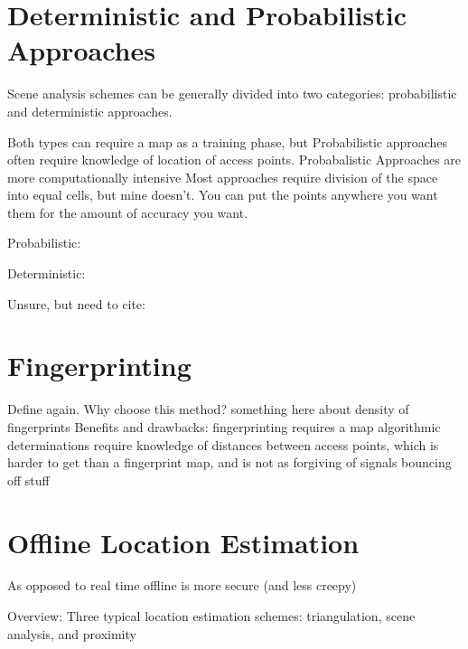 \section{Deterministic and Probabilistic Approaches}
%

Scene analysis schemes can be generally divided into two categories: probabilistic and deterministic approaches. 




Both types can require a map as a training phase, but Probabilistic approaches often require knowledge of location of access points. 
Probabalistic Approaches are more computationally intensive
Most approaches require division of the space into equal cells, but mine doesn't. You can put the points anywhere you want them for the amount of accuracy you want. 

Probabilistic:
\cite{ito2005bayesian}
\cite{seshadri2005bayesian}
\cite{hotta2012robust}

Deterministic:
\cite{arias2004malguki}
\cite{quan2010wi}
\cite{nagaosa2012dept}

Unsure, but need to cite:
\cite{priyantha2005cricket}
\cite{xiong2012towards}
\cite{xiong2013arraytrack}
\cite{bahl2000enhancements}
\cite{bahl2000radar}
\cite{turner2011empirical}

 
 
\section{Fingerprinting}
%

Define again.
Why choose this method?
something here about density of fingerprints
Benefits and drawbacks:
	fingerprinting requires a map
	algorithmic determinations require knowledge of distances between access points, which is harder to get than a fingerprint map, and is not as forgiving of signals bouncing off stuff

\section{Offline Location Estimation}

As opposed to real time
offline is more secure (and less creepy) 





Overview:
\cite{liu2007survey}
	Three typical location estimation schemes: triangulation, scene analysis, and proximity
	
